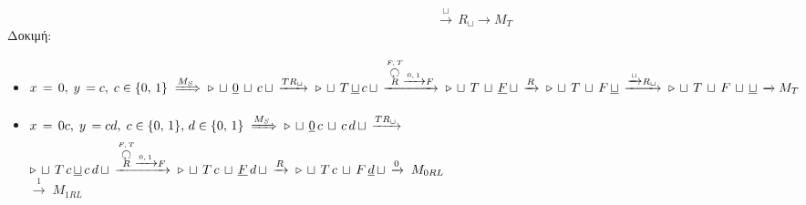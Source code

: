 \reducevspace\reducevspace\reducevspace\reducevspace\reducevspace\reducevspace\reducevspace\reducevspace\reducevspace
\reducevspace\reducevspace\reducevspace\reducevspace\reducevspace\reducevspace\reducevspace\reducevspace\reducevspace
\reducevspace\reducevspace\reducevspace\reducevspace\reducevspace\reducevspace\reducevspace\reducevspace\reducevspace
\reducevspace\reducevspace\reducevspace\reducevspace\reducevspace\reducevspace\reducevspace\reducevspace\reducevspace
\[\qquad\qquad\qquad\qquad\qquad\quad\;\;\,\xrightarrow{\sqcup}\, R_\sqcup \rightarrow M_T\]
\reducevspace\reducevspace\reducevspace\reducevspace\reducevspace\reducevspace\reducevspace\reducevspace\reducevspace
Δοκιμή:
\reducevspace\reducevspace\reducevspace\reducevspace\reducevspace\reducevspace\reducevspace\reducevspace\reducevspace
\begin{itemize}
	\itemsep0em
	\item $x\,=\,0,\; y\,=c,\; c\in\{0,\,1\} \;\xRightarrow{M_S}\;
	\triangleright\, \sqcup\, \underline{0}\, \sqcup\, c\, \sqcup\,\xrightarrow{TR_\sqcup}\;
	\triangleright\, \sqcup\, T\, \underline{\sqcup}\, c\, \sqcup\,
	\xrightarrow{\overset{F,\,T}{\overset{\botcircleleft}{R}}\xrightarrow{0,\,1}F}\;
	\triangleright\, \sqcup\, T\, \sqcup\, \underline{F}\, \sqcup\, \xrightarrow{R}\;
	\triangleright\, \sqcup\, T\, \sqcup\, F\, \underline{\sqcup}\, \xrightarrow{\xrightarrow{\sqcup}R_\sqcup}\;
	\triangleright\, \sqcup\, T\, \sqcup\, F\, \sqcup\, \underline{\sqcup}\, \xrightarrow{} M_T
	\quad$ \textcolor{green}{}

	\item $x\,=\,0c,\; y\,=cd,\; c\in\{0,\,1\},\,d\in\{0,\,1\} \;\xRightarrow{M_S}\;
	\triangleright\, \sqcup\, \underline{0}\, c\, \sqcup\, c\, d\, \sqcup\,\xrightarrow{TR_\sqcup}\;$\\$
	\triangleright\, \sqcup\, T\, c\, \underline{\sqcup}\, c\, d\, \sqcup\,
	\xrightarrow{\overset{F,\,T}{\overset{\botcircleleft}{R}}\xrightarrow{0,\,1}F}\;
	\triangleright\, \sqcup\, T\, c\, \sqcup\, \underline{F}\, d\, \sqcup\, \xrightarrow{R}\;
	\triangleright\, \sqcup\, T\, c\, \sqcup\, F\, \underline{d}\, \sqcup\, \xrightarrow{0}\; M_{0RL}
	\quad$\textcolor{green}{}\\
	\makebox[10.5cm]{\hfill} $\xrightarrow{1}\; M_{1RL}\quad$ \textcolor{green}{}
	\end{itemize}


